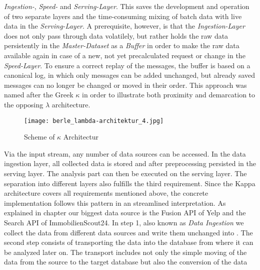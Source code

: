 \textit{Ingestion-}, \textit{Speed-} and \textit{Serving-Layer}.
This saves the development and operation of two separate layers and the time-consuming mixing of batch data with live data in the \textit{Serving-Layer}.
A prerequisite, however, is that the \textit{Ingestion-Layer} does not only pass through data volatilely,
but rather holds the raw data persistently in the \textit{Master-Dataset} as a \textit{Buffer} in order to make the raw data available again in case of a new,
not yet precalculated request or change in the \textit{Speed-Layer}.
To ensure a correct replay of the messages, the buffer is based on a canonical log, in which only messages can be added unchanged, but already saved messages can no
longer be changed or moved in their order.
This approach was named after the Greek $\kappa$ in order to illustrate both proximity and demarcation to the opposing $\lambda$ architecture.
\cite{Kappa} \cite{Kappa2}
\begin{figure}[h]
	\centering
	\texttt{[image: berle\_lambda-architektur\_4.jpg]}
	\caption[Scheme of $\kappa$ Architectur]{Scheme of $\kappa$ Architectur\cite{jaxkappa}}
	\label{fig:KappaArchitecture}
\end{figure}
Via the input stream, any number of data sources can be accessed. In the
data ingestion layer, all collected data is stored and after preprocessing persisted in the serving layer. %
The analysis part can then be executed on the serving layer.
The separation into different layers also fulfills the third requirement. Since the Kappa architecture covers all requirements mentioned above, the concrete implementation follows this pattern in an streamlined interpretation.
\newline
As explained in chapter  our biggest data source is the Fusion \ac{API} of Yelp and
the Search \ac{API} of ImmobilienScout24. %
\newline
In step 1, also known as \textit{Data Ingestion} we collect the data from different data sources and write them unchanged into \gds{}.
The second step consists of transporting the data into the \pg{} database from where it can be analyzed later on.
The transport includes not only the simple moving of the data from the source to the target database but also the conversion of the data
